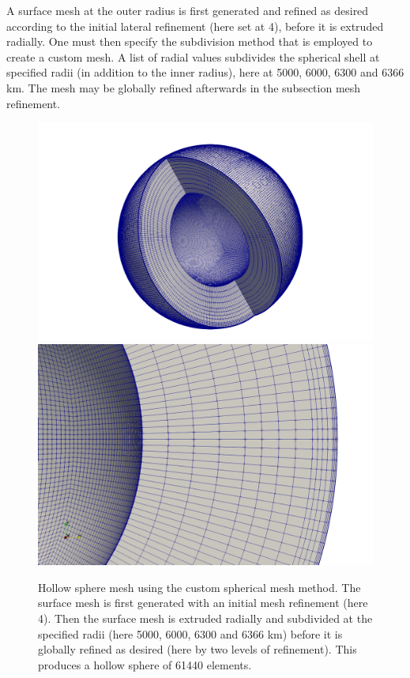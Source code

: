 A surface mesh at the outer radius is first generated and refined as desired according to the initial lateral refinement (here set at 4), before it is extruded radially. One must then specify the subdivision method that is employed to create a custom mesh. A list of radial values subdivides the spherical shell at specified radii (in addition to the inner radius), here at 5000, 6000, 6300 and 6366 \si{km}. The mesh may be globally refined afterwards in the subsection mesh refinement.

\begin{figure}[h!]
\centering
\includegraphics[width=0.48\linewidth]{../../benchmarks/gravity_prem/doc/custom_shell_full.png}
\includegraphics[width=0.48\linewidth]{../../benchmarks/gravity_prem/doc/custom_shell_zoom.png}
\caption{Hollow sphere mesh using the custom spherical mesh method. The surface mesh is first generated with an initial mesh refinement (here 4). Then the surface mesh is extruded radially and subdivided at the specified radii (here 5000, 6000, 6300 and 6366 \si{km}) before it is globally refined as desired (here by two levels of refinement). This produces a hollow sphere of 61440 elements.}
\label{fig:gravityline}
\end{figure}

